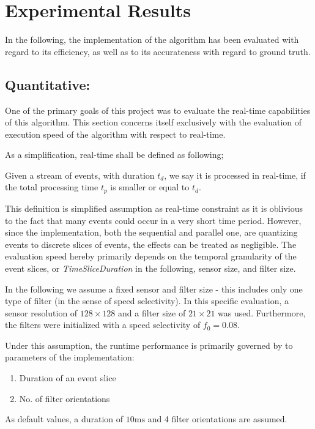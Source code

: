 \newpage
\section{Experimental Results}
In the following, the implementation of the algorithm has been evaluated with regard to its efficiency, as well as to its accurateness with regard to ground truth.

\subsection{Quantitative:}
One of the primary goals of this project was to evaluate the real-time capabilities of this algorithm.
This section concerns itself exclusively with the evaluation of execution speed of the algorithm with respect to real-time.

As a simplification, real-time shall be defined as following;
\begin{defwrp}
	Given a stream of events, with duration $t_d$, we say it is processed in real-time, if the total processing time $t_p$ is smaller or equal to $t_d$.
\end{defwrp}

This definition is simplified assumption as real-time constraint as it is oblivious to the fact that many events could occur in a very short time period.
However, since the implementation, both the sequential and parallel one, are quantizing events to discrete slices of events, the effects can be treated as negligible.
The evaluation speed hereby primarily depends on the temporal granularity of the event slices, or \textit{TimeSliceDuration} in the following, sensor size, and filter size.

In the following we assume a fixed sensor and filter size - this includes only one type of filter (in the sense of speed selectivity).
In this specific evaluation, a sensor resolution of $128\times128$ and a filter size of $21\times21$ was used.
Furthermore, the filters were initialized with a speed selectivity of $f_0=0.08$.

Under this assumption, the runtime performance is primarily governed by to parameters of the implementation:
\begin{enumerate}
	\item Duration of an event slice
	\item No. of filter orientations
\end{enumerate}

As default values, a duration of $10\mathrm{ms}$ and 4 filter orientations are assumed.

